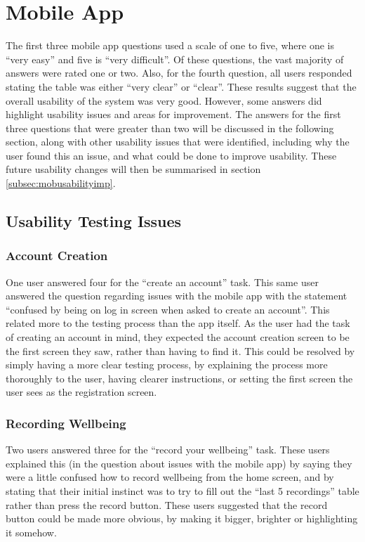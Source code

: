 \documentclass[11pt,openright,a4paper]{report}
\begin{document}
\section{Mobile App}
The first three mobile app questions used a scale of one to five, where one is \enquote{very easy} and five is \enquote{very difficult}. Of these questions, the vast majority of answers were rated one or two. Also, for the fourth question, all users responded stating the table was either \enquote{very clear} or \enquote{clear}. These results suggest that the overall usability of the system was very good. However, some answers did highlight usability issues and areas for improvement. The answers for the first three questions that were greater than two will be discussed in the following section, along with other usability issues that were identified, including why the user found this an issue, and what could be done to improve usability. These future usability changes will then be summarised in section \ref{subsec:mobusabilityimp}.

\subsection{Usability Testing Issues}
\subsubsection{Account Creation}
One user answered four for the \enquote{create an account} task. This same user answered the question regarding issues with the mobile app with the statement \enquote{confused by being on log in screen when asked to create an account}. This related more to the testing process than the app itself. As the user had the task of creating an account in mind, they expected the account creation screen to be the first screen they saw, rather than having to find it. This could be resolved by simply having a more clear testing process, by explaining the process more thoroughly to the user, having clearer instructions, or setting the first screen the user sees as the registration screen.

\subsubsection{Recording Wellbeing}
Two users answered three for the \enquote{record your wellbeing} task. These users explained this (in the question about issues with the mobile app) by saying they were a little confused how to record wellbeing from the home screen, and by stating that their initial instinct was to try to fill out the \enquote{last 5 recordings} table rather than press the record button. These users suggested that the record button could be made more obvious, by making it bigger, brighter or highlighting it somehow.
\end{document}
